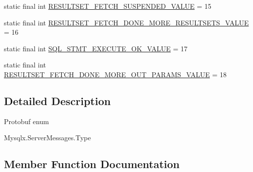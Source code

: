 \begin{DoxyCompactItemize}
\item 
static final int \mbox{\hyperlink{enumcom_1_1mysql_1_1cj_1_1x_1_1protobuf_1_1_mysqlx_1_1_server_messages_1_1_type_af1b8d750f8d68d103553b71b028e2c6d}{R\+E\+S\+U\+L\+T\+S\+E\+T\+\_\+\+F\+E\+T\+C\+H\+\_\+\+S\+U\+S\+P\+E\+N\+D\+E\+D\+\_\+\+V\+A\+L\+UE}} = 15
\item 
static final int \mbox{\hyperlink{enumcom_1_1mysql_1_1cj_1_1x_1_1protobuf_1_1_mysqlx_1_1_server_messages_1_1_type_ada9373c326931255bdc226e2bc518a38}{R\+E\+S\+U\+L\+T\+S\+E\+T\+\_\+\+F\+E\+T\+C\+H\+\_\+\+D\+O\+N\+E\+\_\+\+M\+O\+R\+E\+\_\+\+R\+E\+S\+U\+L\+T\+S\+E\+T\+S\+\_\+\+V\+A\+L\+UE}} = 16
\item 
static final int \mbox{\hyperlink{enumcom_1_1mysql_1_1cj_1_1x_1_1protobuf_1_1_mysqlx_1_1_server_messages_1_1_type_a3453ef2f3a221063a09242e4e6157352}{S\+Q\+L\+\_\+\+S\+T\+M\+T\+\_\+\+E\+X\+E\+C\+U\+T\+E\+\_\+\+O\+K\+\_\+\+V\+A\+L\+UE}} = 17
\item 
static final int \mbox{\hyperlink{enumcom_1_1mysql_1_1cj_1_1x_1_1protobuf_1_1_mysqlx_1_1_server_messages_1_1_type_aeda6f4c76f96be07b406d974e813bea3}{R\+E\+S\+U\+L\+T\+S\+E\+T\+\_\+\+F\+E\+T\+C\+H\+\_\+\+D\+O\+N\+E\+\_\+\+M\+O\+R\+E\+\_\+\+O\+U\+T\+\_\+\+P\+A\+R\+A\+M\+S\+\_\+\+V\+A\+L\+UE}} = 18
\end{DoxyCompactItemize}


\subsection{Detailed Description}
Protobuf enum
\begin{DoxyCode}
Mysqlx.ServerMessages.Type 
\end{DoxyCode}
 

\subsection{Member Function Documentation}
\mbox{\label{enumcom_1_1mysql_1_1cj_1_1x_1_1protobuf_1_1_mysqlx_1_1_server_messages_1_1_type_ad4202b021bdf5da61ee60505d87980e9}} 
